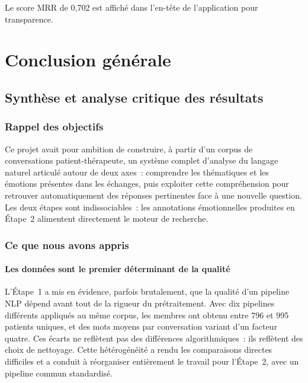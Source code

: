 \documentclass[12pt,a4paper]{report}
\begin{document}
Le score MRR de 0,702 est affiché dans l'en-tête de
l'application pour transparence.


\part{Conclusion générale}

\chapter{Synthèse et analyse critique des résultats}

\section{Rappel des objectifs}

Ce projet avait pour ambition de construire, à partir d'un corpus de conversations
patient-thérapeute, un système complet d'analyse du langage naturel articulé autour de
deux axes~: comprendre les thématiques et les émotions présentes dans les échanges, puis
exploiter cette compréhension pour retrouver automatiquement des réponses pertinentes
face à une nouvelle question. Les deux étapes sont indissociables~: les annotations
émotionnelles produites en Étape~2 alimentent directement le moteur de recherche.

\section{Ce que nous avons appris}

\subsection{Les données sont le premier déterminant de la qualité}

L'Étape~1 a mis en évidence, parfois brutalement, que la qualité d'un pipeline NLP dépend
avant tout de la rigueur du prétraitement. Avec dix pipelines différents appliqués au même
corpus, les membres ont obtenu entre 796 et 995 patients uniques, et des mots moyens par
conversation variant d'un facteur quatre. Ces écarts ne reflètent pas des différences
algorithmiques~: ils reflètent des choix de nettoyage. Cette hétérogénéité a rendu les
comparaisons directes difficiles et a conduit à réorganiser entièrement le travail pour
l'Étape~2, avec un pipeline commun standardisé.
\end{document}
